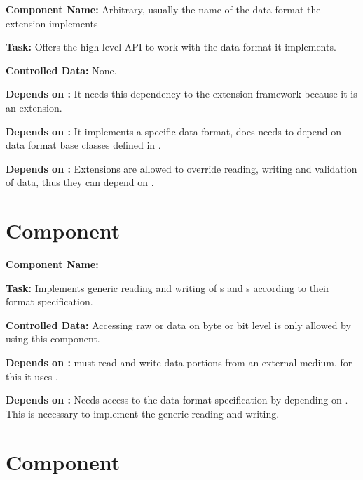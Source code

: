 \textbf{Component Name:} Arbitrary, usually the name of the data format the extension implements

\textbf{Task:} Offers the high-level API to work with the data format it implements.

\textbf{Controlled Data:} None.

\textbf{Depends on \COMPextensionManagement{}:} It needs this dependency to the extension framework because it is an extension.

\textbf{Depends on \COMPdataFormatManagement{}:} It implements a specific data format, does needs to depend on data format base classes defined in \COMPdataFormatManagement{}.

\textbf{Depends on \COMPdataPartManagement{}:} Extensions are allowed to override reading, writing and validation of data, thus they can depend on \COMPdataPartManagement{}.


\section{Component \COMPdataPartManagement{}}
\label{sec:COMPdataPartManagement}

\textbf{Component Name:} \COMPdataPartManagement{}

\textbf{Task:} Implements generic reading and writing of \TERMcontainerFormat{}s and \TERMmetadataFormat{}s according to their format specification.

\textbf{Controlled Data:} Accessing raw \TERMcontainer{} or \TERMtag{} data on byte or bit level is only allowed by using this component.

\textbf{Depends on \COMPmedia{}:} \COMPdataPartManagement{} must read and write data portions from an external medium, for this it uses \COMPmedia{}.

\textbf{Depends on \COMPdataFormatManagement{}:} Needs access to the data format specification by depending on \COMPdataFormatManagement{}. This is necessary to implement the generic reading and writing.


\section{Component \COMPdataFormatManagement{}}
\label{sec:COMPdataFormatManagement}

